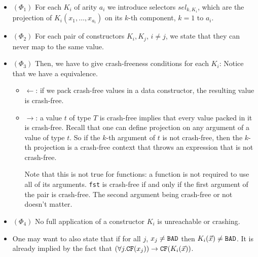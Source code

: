 \documentclass[preprint]{sigplanconf}
\begin{document}
\begin{itemize}
\item $(\Phi_1)$ For each $K_i$ of arity $a_i$ we introduce selectors
  $sel_{k,K_i}$, which are the projection of $K_i(x_1,\dots,x_{a_i})$
  on its $k$-th component, $k = 1\text{ to }a_i$.
\item $(\Phi_2)$ For each pair of constructors $K_i,K_j$, $i \not = j$, we state that they can
  never map to the same value.
\item $(\Phi_3)$ Then, we have to give crash-freeness conditions for each $K_i$:
  Notice that we have a equivalence.
  \begin{itemize}
  \item $\leftarrow$: if we pack crash-free values in a data
    constructor, the resulting value is crash-free.
  \item $\rightarrow$: a value $t$ of type $T$ is crash-free implies
    that every value packed in it is crash-free. Recall that one can
    define projection on any argument of a value of type $t$. So if
    the $k$-th argument of $t$ is not crash-free, then the $k$-th
    projection is a crash-free context that throws an expression that
    is not crash-free.

  Note that this is not true for functions: a function is not required
  to use all of its arguments. \texttt{fst} is crash-free if and only
  if the first argument of the pair is crash-free. The second argument
  being crash-free or not doesn't matter.
  \end{itemize}

\item $(\Phi_4)$ No full application of a constructor $K_i$ is unreachable or crashing.
\item One may want to also state that if for all $j$, $x_j \neq \texttt{BAD}$ then
  $K_i(\vec{x}) \neq \texttt{BAD}$. It is already implied by the fact that
  $\left(\forall j. \texttt{CF}(x_j)\right) \to \texttt{CF}(K_i(\vec{x}))$.
\end{itemize}
\end{document}
